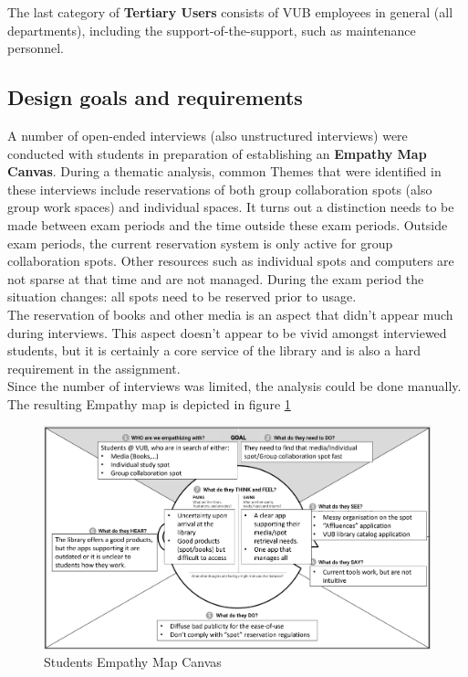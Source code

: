 \documentclass[a4paper, 11pt]{article}
\begin{document}
The last category of \textbf{Tertiary Users} consists of VUB employees in general (all departments), including the support-of-the-support, such as maintenance personnel. 


\subsection{Design goals and requirements}

A number of open-ended interviews (also unstructured interviews) were conducted with students in preparation of establishing an \textbf{Empathy Map Canvas}. During a thematic analysis, common Themes that were identified in these interviews include  reservations of both group collaboration spots (also group work spaces) and individual spaces. It turns out a distinction needs to be made between exam periods and the time outside these exam periods. Outside exam periods, the current reservation system is only active for group collaboration spots. Other resources such as individual spots and computers are not sparse at that time and are not managed. During the exam period the situation changes: all spots need to be reserved prior to usage.\\

The reservation of books and other media is an aspect that didn't appear much during interviews. This aspect doesn't appear to be vivid amongst interviewed students, but it is certainly a core service of the library and is also a hard requirement in the assignment.\\

Since the number of interviews was limited, the analysis could be done manually. The resulting Empathy map is depicted in figure \ref{fig:empathymapcanvasstudents}\\

\begin{figure}[h]
	\centering
	\includegraphics[width=0.8\linewidth]{figures/EmpathyMapCanvasStudents}
	\caption{Students Empathy Map Canvas}
	\label{fig:empathymapcanvasstudents}
\end{figure}
\end{document}
